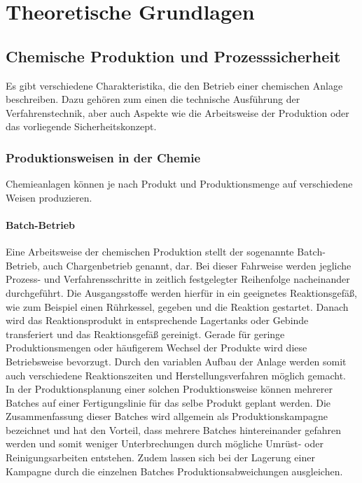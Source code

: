 \newpage
\section{Theoretische Grundlagen}
\label{sec:grundlagen}



\subsection{Chemische Produktion und Prozesssicherheit}
Es gibt verschiedene Charakteristika, die den Betrieb einer chemischen Anlage beschreiben. Dazu gehören zum einen die technische Ausführung der Verfahrenstechnik, aber auch Aspekte wie die Arbeitsweise der Produktion oder das vorliegende Sicherheitskonzept.

\subsubsection{Produktionsweisen in der Chemie}
Chemieanlagen können je nach Produkt und Produktionsmenge auf verschiedene Weisen produzieren. 

\paragraph{Batch-Betrieb} Eine Arbeitsweise der chemischen Produktion stellt der sogenannte Batch-Betrieb, auch Chargenbetrieb genannt, dar. Bei dieser Fahrweise werden jegliche Prozess- und Verfahrensschritte in zeitlich festgelegter Reihenfolge nacheinander durchgeführt. Die Ausgangsstoffe werden hierfür in ein geeignetes Reaktionsgefäß, wie zum Beispiel einen Rührkessel, gegeben und die Reaktion gestartet. Danach wird das Reaktionsprodukt in entsprechende Lagertanks oder Gebinde transferiert und das Reaktionsgefäß gereinigt.\linebreak
Gerade für geringe Produktionsmengen oder häufigerem Wechsel der Produkte wird diese Betriebsweise bevorzugt. Durch den variablen Aufbau der Anlage werden somit auch verschiedene Reaktionszeiten und Herstellungsverfahren möglich gemacht.\,\cite{Ignatowitz.2015}\linebreak
In der Produktionsplanung einer solchen Produktionsweise können mehrerer Batches auf einer Fertigungslinie für das selbe Produkt geplant werden. Die Zusammenfassung dieser Batches wird allgemein als Produktionskampagne bezeichnet und hat den Vorteil, dass mehrere Batches hintereinander gefahren werden und somit weniger Unterbrechungen durch mögliche Umrüst- oder Reinigungsarbeiten entstehen. Zudem lassen sich bei der Lagerung einer Kampagne durch die einzelnen Batches Produktionsabweichungen ausgleichen.\,\cite{SAP.04.02.2022}

